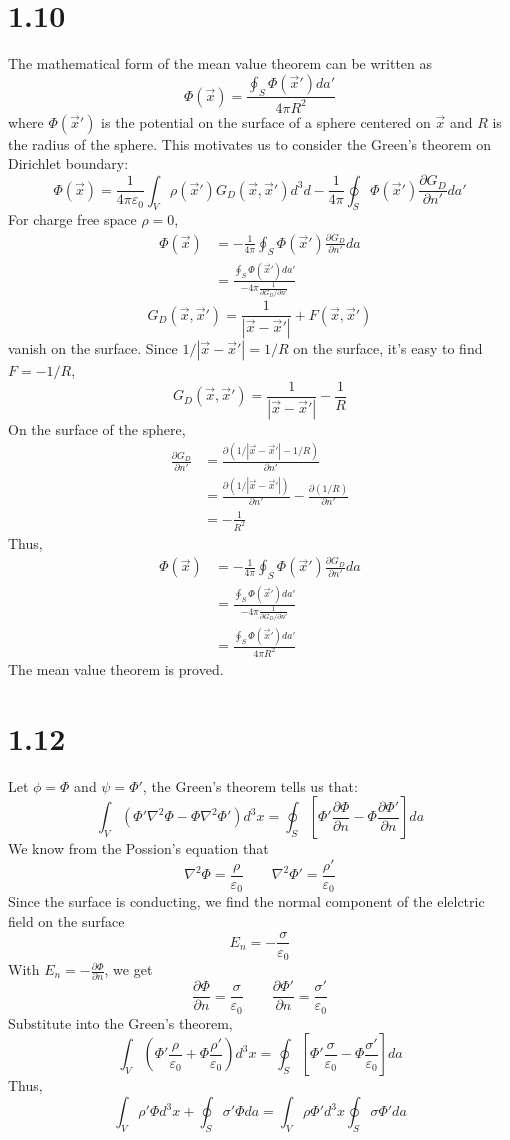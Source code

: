 \documentclass{article}
\begin{document}
\section*{1.10}
The mathematical form of the mean value theorem can be written as
\[ \Phi(\vec x)=\frac{\oint_S\Phi(\vec x')da'}{4\pi R^2} \]
where $\Phi(\vec x')$ is the potential on the surface of a sphere centered on $\vec x$ and $R$ is the radius of the sphere. This motivates us
to consider the Green's theorem on Dirichlet boundary:
\[ \Phi(\vec x)=\frac{1}{4\pi\varepsilon_0}\int_V\rho(\vec x')G_D(\vec x,\vec x')d^3d-\frac{1}{4\pi}\oint_S\Phi(\vec x')\frac{\partial G_D}
{\partial n'}da' \]
For charge free space $\rho=0$,
\begin{align*}
\Phi(\vec x)&=-\frac{1}{4\pi}\oint_S\Phi(\vec x')\frac{\partial G_D}{\partial n'}da\\
            &=\frac{\oint_S\Phi(\vec x')da'}{-4\pi\frac{1}{\partial G_D/\partial n'}}
\end{align*}
\[ G_D(\vec x,\vec x')=\frac{1}{|\vec x-\vec x'|}+F(\vec x,\vec x') \]
vanish on the surface. Since $1/|\vec x-\vec x'|=1/R$ on the surface, it's easy to find $F=-1/R$,
\[ G_D(\vec x,\vec x')=\frac{1}{|\vec x-\vec x'|}-\frac{1}{R} \]
On the surface of the sphere,
\begin{align*}
\frac{\partial G_D}{\partial n'}&=\frac{\partial (1/|\vec x-\vec x'|-1/R)}{\partial n'}\\
&=\frac{\partial (1/|\vec x-\vec x'|)}{\partial n'}-\frac{\partial (1/R)}{\partial n'}\\
&=-\frac{1}{R^2}
\end{align*}
Thus,
  \begin{align*}
  \Phi(\vec x)&=-\frac{1}{4\pi}\oint_S\Phi(\vec x')\frac{\partial G_D}{\partial n'}da\\
              &=\frac{\oint_S\Phi(\vec x')da'}{-4\pi\frac{1}{\partial G_D/\partial n'}}\\
              &=\frac{\oint_S\Phi(\vec x')da'}{4\pi R^2}
  \end{align*}
The mean value theorem is proved.
\pagebreak
\section*{1.12}
Let $\phi=\Phi$ and $\psi=\Phi'$, the Green's theorem tells us that:
\[ \int_V(\Phi'\nabla^2\Phi-\Phi\nabla^2\Phi')d^3x=\oint_S[\Phi'\frac{\partial\Phi}{\partial n}-\Phi\frac{\partial\Phi'}{\partial n}]da\]
We know from the Possion's equation that
\[ \nabla^2\Phi=\frac{\rho}{\varepsilon_0}\qquad\nabla^2\Phi'=\frac{\rho'}{\varepsilon_0} \]
Since the surface is conducting, we find the normal component of the elelctric field on the surface
\[ E_n=-\frac{\sigma}{\varepsilon_0} \]
With $E_n=-\frac{\partial\Phi}{\partial n}$, we get
\[\frac{\partial\Phi}{\partial n}=\frac{\sigma}{\varepsilon_0}\qquad\frac{\partial\Phi'}{\partial n}=\frac{\sigma'}{\varepsilon_0} \]
Substitute into the Green's theorem,
\[\int_V(\Phi'\frac{\rho}{\varepsilon_0}+\Phi\frac{\rho'}{\varepsilon_0})d^3x=\oint_S[\Phi'\frac{\sigma}{\varepsilon_0}-\Phi\frac{\sigma'}{\varepsilon_0}]da \]
Thus,
\[ \int_V\rho'\Phi d^3x+\oint_S\sigma'\Phi da=\int_V\rho\Phi' d^3x\oint_S\sigma\Phi' da \]
\end{document}
